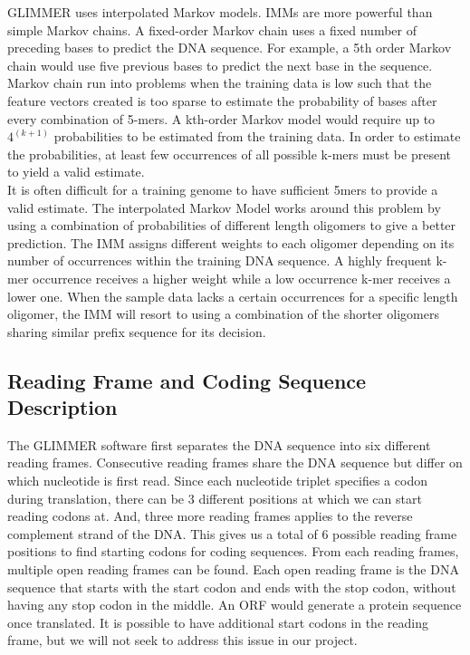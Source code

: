\documentclass[11pt,letterpaper]{article}
\begin{document}
GLIMMER uses interpolated Markov models. IMMs are more powerful than simple Markov chains. A fixed-order Markov chain uses a fixed number of preceding bases to predict the DNA sequence. For example, a 5th order Markov chain would use five previous bases to predict the next base in the sequence. Markov chain run into problems when the training data is low such that the feature vectors created is too sparse to estimate the probability of bases after every combination of 5-mers. A kth-order Markov model would require up to $4^ (k+1)$ probabilities to be estimated from the training data. In order to estimate the probabilities, at least few occurrences of all possible k-mers must be present to yield a valid estimate. \\

It is often difficult for a training genome to have sufficient 5mers to provide a valid estimate. The interpolated Markov Model works around this problem by using a combination of probabilities of different length oligomers to give a better prediction. The IMM assigns different weights to each oligomer depending on its number of occurrences within the training DNA sequence. A highly frequent k-mer occurrence receives a higher weight while a low occurrence k-mer receives a lower one. When the sample data lacks a certain occurrences for a specific length oligomer, the IMM will resort to using a combination of the shorter oligomers sharing similar prefix sequence for its decision. 


\subsection{Reading Frame and Coding Sequence Description}

The GLIMMER software first separates the DNA sequence into six different reading frames. Consecutive reading frames share the DNA sequence but differ on which nucleotide is first read. Since each nucleotide triplet specifies a codon during translation, there can be 3 different positions at which we can start reading codons at. And, three more reading frames applies to the reverse complement strand of the DNA. This gives us a total of 6 possible reading frame positions to find starting codons for coding sequences. 
From each reading frames, multiple open reading frames can be found. Each open reading frame is the DNA sequence that starts with the start codon and ends with the stop codon, without having any stop codon in the middle. An ORF would generate a protein sequence once translated. It is possible to have additional start codons in the reading frame, but we will not seek to address this issue in our project. 
\end{document}
